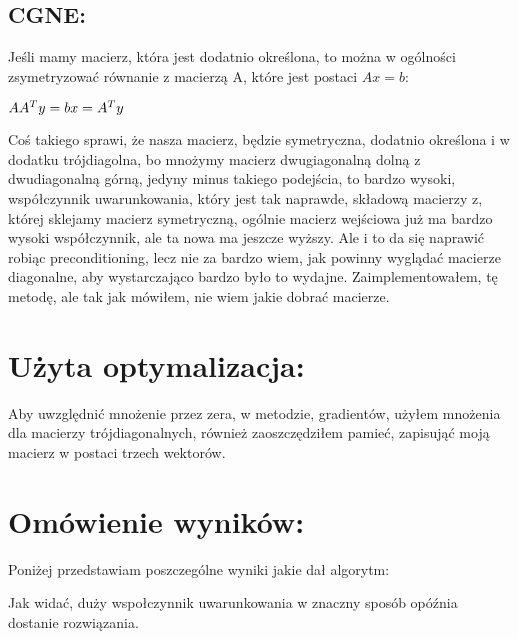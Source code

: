 \documentclass[12pt]{article}
\begin{document}
\subsection{CGNE: }
Jeśli mamy macierz, która jest dodatnio określona, to można w ogólności zsymetryzować równanie z macierzą A, które jest postaci $Ax=b$:
\begin{center}
$
AA^{T}y=b \newline
x=A^{T}y
$
\end{center}
Coś takiego sprawi, że nasza macierz, będzie symetryczna, dodatnio określona i w dodatku trójdiagolna, bo mnożymy macierz dwugiagonalną dolną z dwudiagonalną górną, jedyny minus takiego podejścia, to bardzo wysoki, współczynnik uwarunkowania, który jest tak naprawde, składową macierzy z, której sklejamy macierz symetryczną, ogólnie macierz wejściowa już ma bardzo wysoki współczynnik, ale ta nowa ma jeszcze wyższy. Ale i to da się naprawić robiąc preconditioning, lecz nie za bardzo wiem, jak powinny wyglądać macierze diagonalne, aby wystarczająco bardzo było to wydajne. Zaimplementowałem, tę metodę, ale tak jak mówiłem, nie wiem jakie dobrać macierze.
\section{Użyta optymalizacja:}
Aby uwzględnić mnożenie przez zera, w metodzie, gradientów, użyłem mnożenia dla macierzy trójdiagonalnych, również zaoszczędziłem pamieć, zapisująć moją macierz w postaci trzech wektorów.
\section{Omówienie wyników:}
Poniżej przedstawiam poszczególne wyniki jakie dał algorytm:
\begin{center}

\end{center}
Jak widać, duży wspołczynnik uwarunkowania w znaczny sposób opóźnia dostanie rozwiązania.
\end{document}
